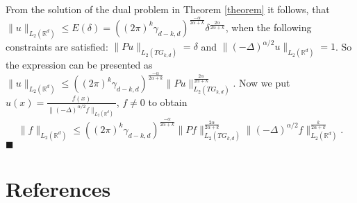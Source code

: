 \documentclass[12pt]{iopart}
\newenvironment{proof}
{\par\noindent{\bf Proof}}
{\hfill$\scriptstyle\blacksquare$}
\begin{document}
\begin{proof}
From the solution of the dual problem in Theorem \ref{theorem} it follows, that \linebreak
 $\|u\|_{L_2(\mathbb R^d)}\leqslant E(\delta)=
  ((2\pi)^k\gamma_{d-k,d})^{\frac{-\alpha}{2\alpha+k}}\delta^{\frac{2\alpha}{2\alpha+k}}$, 
  when the following constraints are satisfied: $\|Pu\|_{L_2(TG_{k,d})}=\delta$ and
  $\|(-\Delta)^{\alpha/2}u\|_{L_2(\mathbb R^d)}=1$. So the expression can be presented as \linebreak
$\|u\|_{L_2(\mathbb R^d)}\leqslant
  ((2\pi)^k\gamma_{d-k,d})^{\frac{-\alpha}{2\alpha+k}}\|Pu\|_{L_2(TG_{k,d})}^{\frac{2\alpha}{2\alpha+k}}$.
 Now we put
 $u(x)=\frac{f(x)}{\|(-\Delta)^{\alpha/2}f\|_{L_2(\mathbb R^d)}}$, $f\ne 0$ to obtain
\[
\|f\|_{L_2(\mathbb R^d)}\leqslant
((2\pi)^k\gamma_{d-k,d})^{\frac{-\alpha}{2\alpha+k}}\|Pf\|_{L_2(TG_{k,d})}^{\frac{2\alpha}{2\alpha+k}}\|(-\Delta)^{\alpha/2}f\|_{L_2(\mathbb
  R^d)}^\frac{k}{2\alpha+k}.
\]
\end{proof}

\section*{References}


\end{document}
